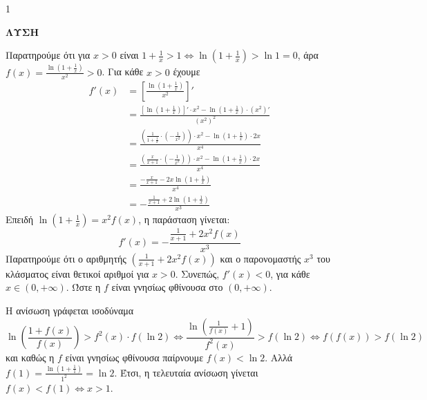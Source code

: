 \begin{ylh}{1}
    \item [Ύλη από εικόνα]
\end{ylh}
\textbf{ΛΥΣΗ}

\begin{alist}
    \item Παρατηρούμε ότι για $x > 0$ είναι $1 + \frac{1}{x} > 1 \Leftrightarrow \ln \left(1 + \frac{1}{x}\right) > \ln 1 = 0$, άρα $f(x) = \frac{\ln\left(1+\frac{1}{x}\right)}{x^2} > 0$.
    Για κάθε $x > 0$ έχουμε
    \begin{align*}
        f'(x) &= \left[\frac{\ln\left(1+\frac{1}{x}\right)}{x^2}\right]' \\
        &= \frac{\left[\ln\left(1+\frac{1}{x}\right)\right]' \cdot x^2 - \ln\left(1+\frac{1}{x}\right)\cdot (x^2)'}{(x^2)^2} \\
        &= \frac{\left(\frac{1}{1+\frac{1}{x}} \cdot \left(-\frac{1}{x^2}\right)\right) \cdot x^2 - \ln\left(1+\frac{1}{x}\right)\cdot 2x}{x^4} \\
        &= \frac{\left(\frac{x}{x+1} \cdot \left(-\frac{1}{x^2}\right)\right) \cdot x^2 - \ln\left(1+\frac{1}{x}\right)\cdot 2x}{x^4} \\
        &= \frac{-\frac{x}{x+1} - 2x \ln\left(1+\frac{1}{x}\right)}{x^4} \\
        &= -\frac{\frac{1}{x+1} + 2 \ln\left(1+\frac{1}{x}\right)}{x^3}
    \end{align*}
    Επειδή $\ln\left(1+\frac{1}{x}\right) = x^2 f(x)$, η παράσταση γίνεται:
    \[
        f'(x) = -\frac{\frac{1}{x+1} + 2x^2 f(x)}{x^3}
    \]
    Παρατηρούμε ότι ο αριθμητής $\left(\frac{1}{x+1} + 2x^2 f(x)\right)$ και ο παρονομαστής $x^3$ του κλάσματος είναι θετικοί αριθμοί για $x > 0$.
    Συνεπώς, $f'(x) < 0$, για κάθε $x \in (0, +\infty)$.
    Ώστε η $f$ είναι γνησίως φθίνουσα στο $(0, +\infty)$. 

    \item Η ανίσωση γράφεται ισοδύναμα
    \[
        \ln \left(\frac{1+f(x)}{f(x)}\right) > f^2(x) \cdot f(\ln2) \Leftrightarrow \frac{\ln\left(\frac{1}{f(x)}+1\right)}{f^2(x)} > f(\ln2) \Leftrightarrow f(f(x)) > f(\ln2)
    \]
    και καθώς η $f$ είναι γνησίως φθίνουσα παίρνουμε $f(x) < \ln2$.
    Αλλά $f(1) = \frac{\ln\left(1+\frac{1}{1}\right)}{1^2} = \ln2$.
    Έτσι, η τελευταία ανίσωση γίνεται $f(x) < f(1) \Leftrightarrow x > 1$. 


\end{alist}

